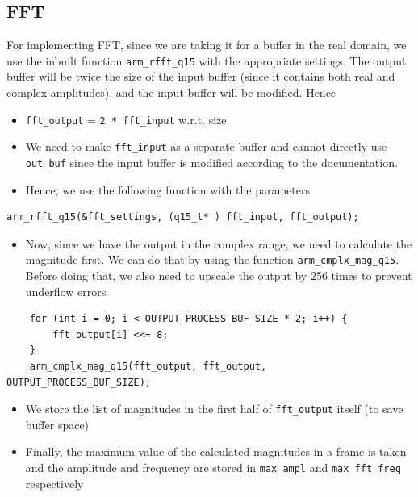 \documentclass[11pt]{article}
\begin{document}
\subsection{FFT}
\label{sec:org3b72ac7}

For implementing FFT, since we are taking it for a buffer in the real domain, we use the inbuilt function \texttt{arm\_rfft\_q15} with the appropriate settings. The output buffer will be twice the size of the input buffer (since it contains both real and complex amplitudes), and the input buffer will be modified. Hence
\begin{itemize}
\item \texttt{fft\_output} = \texttt{2 * fft\_input} w.r.t. size
\item We need to make \texttt{fft\_input} as a separate buffer and cannot directly use \texttt{out\_buf} since the input buffer is modified according to the documentation.

\item Hence, we use the following function with the parameters
\end{itemize}
\begin{verbatim}
arm_rfft_q15(&fft_settings, (q15_t* ) fft_input, fft_output);
\end{verbatim}

\begin{itemize}
\item Now, since we have the output in the complex range, we need to calculate the magnitude first. We can do that by using the function \texttt{arm\_cmplx\_mag\_q15}. Before doing that, we also need to upscale the output by 256 times to prevent underflow errors
\end{itemize}

\begin{verbatim}
	for (int i = 0; i < OUTPUT_PROCESS_BUF_SIZE * 2; i++) {
		fft_output[i] <<= 8;
	}
    arm_cmplx_mag_q15(fft_output, fft_output, OUTPUT_PROCESS_BUF_SIZE);
\end{verbatim}

\begin{itemize}
\item We store the list of magnitudes in the first half of \texttt{fft\_output} itself (to save buffer space)

\item Finally, the maximum value of the calculated magnitudes in a frame is taken and the amplitude and frequency are stored in \texttt{max\_ampl} and \texttt{max\_fft\_freq} respectively
\end{itemize}
\end{document}

